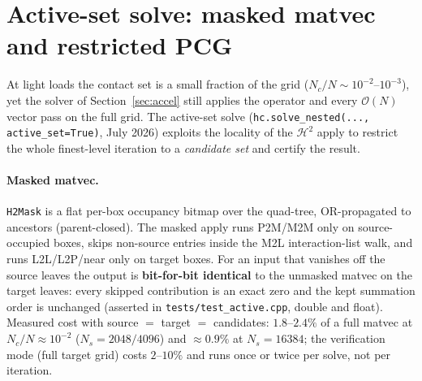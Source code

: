 \documentclass[11pt,a4paper]{article}
\newcommand{\Order}{\mathcal{O}}
\begin{document}
\section{Active-set solve: masked matvec and restricted PCG}
\label{sec:active-note}

At light loads the contact set is a small fraction of the grid
($N_c/N\sim10^{-2}$--$10^{-3}$), yet the solver of
Section~\ref{sec:accel} still applies the operator and every $\Order(N)$
vector pass on the full grid. The active-set solve
(\texttt{hc.solve\_nested(..., active\_set=True)}, July 2026) exploits the
locality of the $\mathcal{H}^2$ apply to restrict the whole finest-level
iteration to a \emph{candidate set} and certify the result.

\paragraph{Masked matvec.} \texttt{H2Mask} is a flat per-box occupancy
bitmap over the quad-tree, OR-propagated to ancestors (parent-closed).
The masked apply runs P2M/M2M only on source-occupied boxes, skips
non-source entries inside the M2L interaction-list walk, and runs
L2L/L2P/near only on target boxes. For an input that vanishes off the
source leaves the output is \textbf{bit-for-bit identical} to the unmasked
matvec on the target leaves: every skipped contribution is an exact zero and
the kept summation order is unchanged (asserted in
\texttt{tests/test\_active.cpp}, double and float). Measured cost with source
$=$ target $=$ candidates: $1.8$--$2.4\%$ of a full matvec at
$N_c/N\approx10^{-2}$ ($N_s=2048/4096$) and $\approx\!0.9\%$ at $N_s=16384$;
the verification mode (full target grid) costs $2$--$10\%$ and runs once or
twice per solve, not per iteration.
\end{document}
